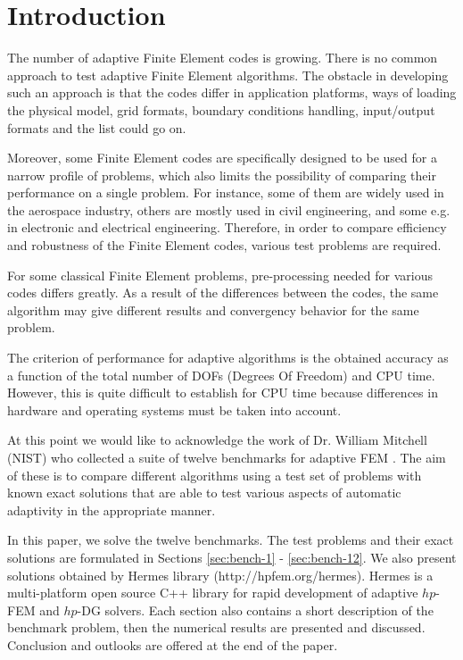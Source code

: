 \documentclass[12pt]{elsarticle}
\begin{document}

\section{Introduction}
\label{sec:intro}

The number of adaptive Finite Element codes is growing.
There is no common approach to test adaptive
Finite Element algorithms. The obstacle in developing such an approach is that
the codes differ in application platforms, ways of loading the physical model,
grid formats, boundary conditions handling, input/output formats and the list could go on.

Moreover, some Finite Element codes are specifically designed to be used for
a narrow profile of problems, which also limits the possibility of comparing
their performance on a single problem.
For instance, some of them are widely used in the aerospace industry, others are
mostly used in civil engineering, and some e.g. in electronic and electrical engineering.
Therefore, in order to compare efficiency and robustness of the Finite Element
codes, various test problems are required.

For some classical Finite Element problems, pre-processing
needed for various codes differs greatly.
As a result of the differences between the codes,
the same algorithm may give different results and convergency
behavior for the same problem.

The criterion of performance for adaptive algorithms
is the obtained accuracy as a function of the total number
of DOFs (Degrees Of Freedom) and CPU time. However,
this is quite difficult to establish for CPU time because
differences in hardware and operating systems must be taken into account.

At this point we would like to acknowledge the work of
Dr. William Mitchell (NIST) who collected a suite of
twelve benchmarks for adaptive FEM \cite{mitchell-1}.
The aim of these is to compare different algorithms
using a test set of problems with known exact solutions
that are able to test various aspects of automatic
adaptivity in the appropriate manner.

In this paper, we solve the twelve benchmarks.
The test problems and their exact solutions are
formulated in Sections \ref{sec:bench-1} - \ref{sec:bench-12}.
We also present solutions obtained by {\sc Hermes} library (http://hpfem.org/hermes).
{\sc Hermes} is a multi-platform open source C++
library for rapid development of adaptive $hp$-FEM
and $hp$-DG solvers. Each section also contains a short
description of the benchmark problem, then the numerical
results are presented and discussed. Conclusion and outlooks
are offered at the end of the paper.
\end{document}

